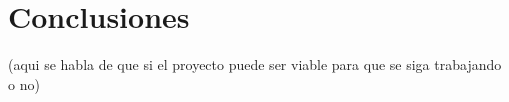 \chapter{Conclusiones}
(aqui se habla de que si el proyecto puede ser viable para que se siga trabajando o no) 
